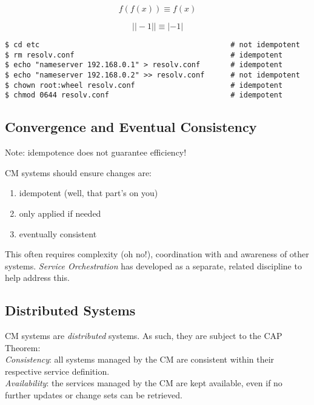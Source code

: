 \documentclass[xga]{xdvislides}
\begin{document}
\begin{displaymath}
f(f(x)) \equiv f(x)
\end{displaymath}

\begin{displaymath}
| |-1| | \equiv |-1|
\end{displaymath}

\begin{verbatim}
$ cd etc                                            # not idempotent
$ rm resolv.conf                                    # idempotent
$ echo "nameserver 192.168.0.1" > resolv.conf       # idempotent
$ echo "nameserver 192.168.0.2" >> resolv.conf      # not idempotent
$ chown root:wheel resolv.conf                      # idempotent
$ chmod 0644 resolv.conf                            # idempotent
\end{verbatim}

\subsection{Convergence and Eventual Consistency}
Note: idempotence does not guarantee efficiency! \\
\vspace{.5in}

CM systems should ensure changes are:
\begin{enumerate}
	\item idempotent (well, that part's on you)
	\item only applied if needed
	\item eventually consistent
\end{enumerate}
\vspace{.5in}

This often requires complexity (oh no!), coordination
with and awareness of other systems.  {\em Service
Orchestration} has developed as a separate, related
discipline to help address this.

\subsection{Distributed Systems}
CM systems are {\em distributed} systems.  As such,
they are subject to the CAP Theorem: \\

{\em Consistency}: all systems managed by the CM are
consistent within their respective service definition.
\\

{\em Availability}: the services managed by the CM are
kept available, even if no further updates or change
sets can be retrieved. \\
\end{document}
